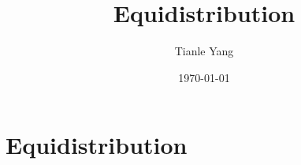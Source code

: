 \documentclass[sectionlevel=section,status=draft]{noteformyself}
\title{Equidistribution}
\author{Tianle Yang}
\date{\today}
\begin{document}
\maketitle

    \section[
      status=draft,
      tag=00000,
      label=\labelNFM{sec:periodic-points-and-orbits:equidistribution}
    ]{Equidistribution}



\end{document}
